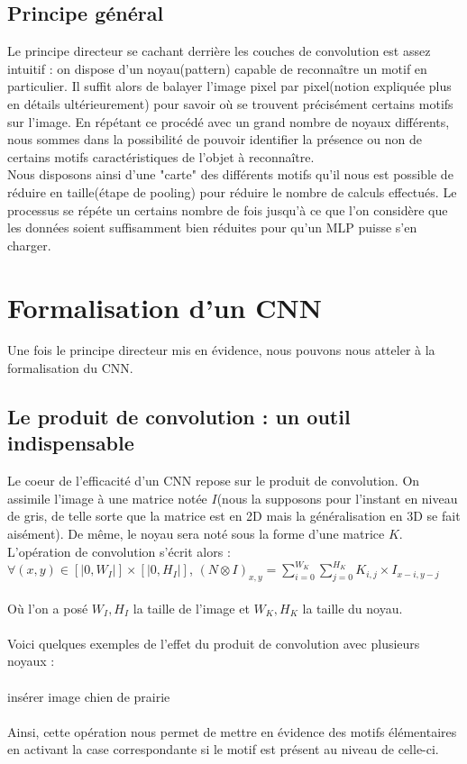 \documentclass{article}
\begin{document}
\subsection{Principe général}
Le principe directeur se cachant derrière les couches de convolution est assez intuitif : on dispose d'un noyau(pattern) capable de reconnaître un motif en particulier. Il suffit alors de balayer l'image pixel par pixel(notion expliquée plus en détails ultérieurement) pour savoir où se trouvent précisément certains motifs sur l'image. En répétant ce procédé avec un grand nombre de noyaux différents, nous sommes dans la possibilité de pouvoir identifier la présence ou non de certains motifs caractéristiques de l'objet à reconnaître. \\
Nous disposons ainsi d'une "carte" des différents motifs qu'il nous est possible de réduire en taille(étape de pooling) pour réduire le nombre de calculs effectués. 
Le processus se répéte un certains nombre de fois jusqu'à ce que l'on considère que les données soient suffisamment bien réduites pour qu'un MLP puisse s'en charger. 

\section{Formalisation d'un CNN}

Une fois le principe directeur mis en évidence, nous pouvons nous atteler à la formalisation du CNN.

\subsection{Le produit de convolution : un outil indispensable}

Le coeur de l'efficacité d'un CNN repose sur le produit de convolution. On assimile l'image à une matrice notée $I$(nous la supposons pour l'instant en niveau de gris, de telle sorte que la matrice est en 2D mais la généralisation en 3D se fait aisément). De même, le noyau sera noté sous la forme d'une matrice $K$.
L'opération de convolution s'écrit alors : \\

$\forall (x,y) \in [|0,W_I|] \times [|0,H_I|]$,  $(N \otimes I)_{x,y} = \sum_{i=0}^{W_K} \sum_{j=0}^{H_K} K_{i,j} \times I_{x-i,y-j}$ \\
\\
Où l'on a posé $W_I,H_I$ la taille de l'image et $W_K,H_K$ la taille du noyau. \\
\\
Voici quelques exemples de l'effet du produit de convolution avec plusieurs noyaux :\\
\\
{insérer image chien de prairie}\\
\\
Ainsi, cette opération nous permet de mettre en évidence des motifs élémentaires en activant la case correspondante si le motif est présent au niveau de celle-ci.
\end{document}
